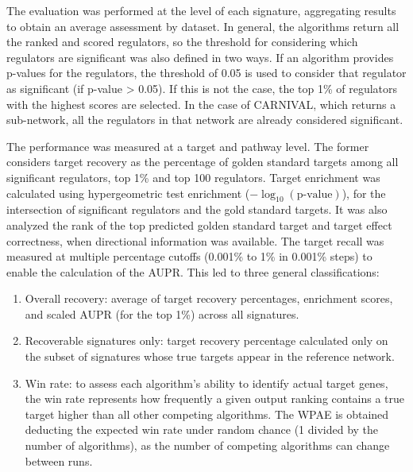 The evaluation was performed at the level of each signature, aggregating results to obtain an average assessment by dataset. In general, the algorithms return all the ranked and scored regulators, so the threshold for considering which regulators are significant was also defined in two ways. If an algorithm provides p-values for the regulators, the threshold of 0.05 is used to consider that regulator as significant (if p-value > 0.05). If this is not the case, the top 1\% of regulators with the highest scores are selected. In the case of \gls{CARNIVAL}, which returns a sub-network, all the regulators in that network are already considered significant.

The performance was measured at a target and pathway level. The former considers target recovery as the percentage of golden standard targets among all significant regulators, top 1\% and top 100 regulators. Target enrichment was calculated using hypergeometric test enrichment ($-\log_{10}(\text{p-value})$), for the intersection of significant regulators and the gold standard targets. It was also analyzed the rank of the top predicted golden standard target and target effect correctness, when directional information was available. The target recall was measured at multiple percentage cutoffs (0.001\% to 1\% in 0.001\% steps) to enable the calculation of the \gls{AUPR}. This led to three general classifications:

\begin{enumerate}
\item Overall recovery: average of target recovery percentages, enrichment scores, and scaled \gls{AUPR} (for the top 1\%) across all signatures.

\item Recoverable signatures only: target recovery percentage calculated only on the subset of signatures whose true targets appear in the reference network.

\item	Win rate: to assess each algorithm's ability to identify actual target genes, the win rate represents how frequently a given output ranking contains a true target higher than all other competing algorithms. The \gls{WPAE} is obtained deducting the expected win rate under random chance (1 divided by the number of algorithms), as the number of competing algorithms can change between runs. 
\end{enumerate}

